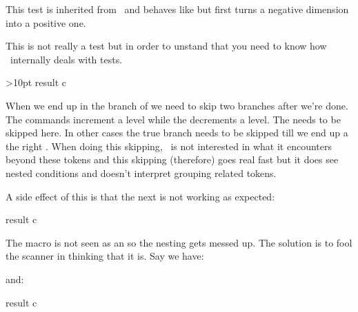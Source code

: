\stopsectionlevel

\startsectionlevel[title={\tex{ifabsdim}}]

This test is inherited from \PDFTEX\ and behaves like \type {\ifdim} but first
turns a negative dimension into a positive one.

\stopsectionlevel

\startsectionlevel[title={\tex{ifcondition}}]

This is not really a test but in order to unstand that you need to know how
\TEX\ internally deals with tests.

\starttyping[option=TEX]
\ifdimen\scratchdimen>10pt
    \ifdim\scratchdimen<20pt
        result a
    \else
        result b
    \fi
\else
    result c
\fi
\stoptyping

When we end up in the branch of  we need to skip two \type
{\else} branches after we're done. The  commands increment a level
while the \type {\fi} decrements a level. The \type {\else} needs to be skipped
here. In other cases the true branch needs to be skipped till we end up a the
right \type {\else}. When doing this skipping, \TEX\ is not interested in what it
encounters beyond these tokens and this skipping (therefore) goes real fast but
it does see nested conditions and doesn't interpret grouping related tokens.

A side effect of this is that the next is not working as expected:

\starttyping[option=TEX]
\def\ifmorethan{\ifdim\scratchdimen>}
\def\iflessthan{\ifdim\scratchdimen<}

    \iflessthan20pt
        result a
    \else
        result b
    \fi
\else
    result c
\fi
\stoptyping

The \type{\iflessthan} macro is not seen as an  so the nesting gets
messed up. The solution is to fool the scanner in thinking that it is. Say we have:

\startbuffer
\scratchdimen=25pt

\def\ifmorethan{\ifdim\scratchdimen>}
\def\iflessthan{\ifdim\scratchdimen<}
\stopbuffer

\typebuffer[option=TEX] \getbuffer

and:

\startbuffer
\ifcondition\ifmorethan10pt
    \ifcondition\iflessthan20pt
        result a
    \else
        result b
    \fi
\else
    result c
\fi
\stopbuffer

\typebuffer[option=TEX]


